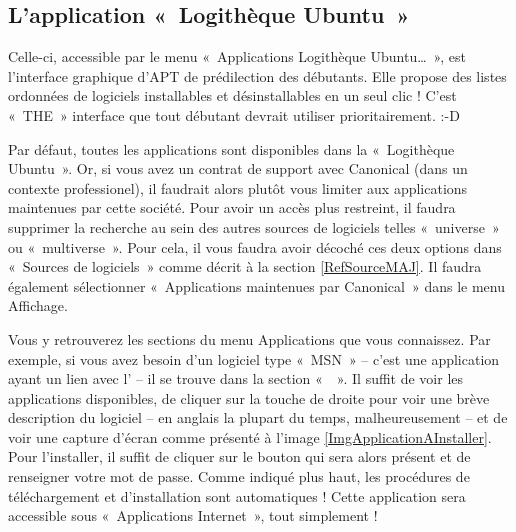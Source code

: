 \subsection{L'application «~Logithèque Ubuntu~»}
Celle-ci, accessible par le menu «~Applications \FlecheDroite Logithèque Ubuntu\dots{}~», est l'interface graphique d'APT de prédilection des débutants. Elle propose des listes ordonnées de logiciels installables et désinstallables en un seul clic ! C'est «~THE~» interface que tout débutant devrait utiliser prioritairement. :-D
\begin{nota}
Par défaut, toutes les applications sont disponibles dans la «~Logithèque Ubuntu~». Or, si vous avez un contrat de support avec Canonical (dans un contexte professionel), il faudrait alors plutôt vous limiter aux applications maintenues par cette société. Pour avoir un accès plus restreint, il faudra supprimer la recherche au sein des autres sources de logiciels telles «~universe~» ou «~multiverse~». Pour cela, il vous faudra avoir décoché ces deux options dans «~Sources de logiciels~» comme décrit à la section \ref{RefSourceMAJ}. Il faudra également sélectionner «~Applications maintenues par Canonical~» dans le menu Affichage.
\end{nota}
Vous y retrouverez les sections du menu Applications que vous connaissez. Par exemple, si vous avez besoin d'un logiciel type «~MSN~» -- c'est une application ayant un lien avec l' -- il se trouve dans la section «~~». Il suffit de voir les applications disponibles, de cliquer sur la touche de droite pour voir une brève description du logiciel -- en anglais la plupart du temps, malheureusement -- et de voir une capture d'écran comme présenté à l'image \ref{ImgApplicationAInstaller}. Pour l'installer, il suffit de cliquer sur le bouton qui sera alors présent et de renseigner votre mot de passe. Comme indiqué plus haut, les procédures de téléchargement et d'installation sont automatiques ! Cette application sera accessible sous «~Applications \FlecheDroite Internet~», tout simplement !\\
